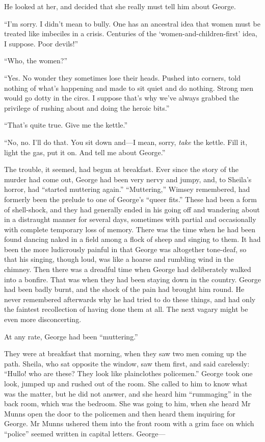 He looked at her, and decided that she really must tell him about George.

\enquote{I'm sorry. I didn't mean to bully. One has an ancestral idea that women must be treated like imbeciles in a crisis. Centuries of the \enquote{women-and-children-first} idea, I suppose. Poor devils!}

\enquote{Who, the women?}

\enquote{Yes. No wonder they sometimes lose their heads. Pushed into corners, told nothing of what's happening and made to sit quiet and do nothing. Strong men would go dotty in the circs. I suppose that's why we've always grabbed the privilege of rushing about and doing the heroic bits.}

\enquote{That's quite true. Give me the kettle.}

\enquote{No, no. I'll do that. You sit down and\allowbreak---\allowbreak I mean, sorry, \textit{take} the kettle. Fill it, light the gas, put it on. And tell me about George.}

The trouble, it seemed, had begun at breakfast. Ever since the story of the murder had come out, George had been very nervy and jumpy, and, to Sheila's horror, had \enquote{started muttering again.} \enquote{Muttering,} Wimsey remembered, had formerly been the prelude to one of George's \enquote{queer fits.} These had been a form of shell-shock, and they had generally ended in his going off and wandering about in a distraught manner for several days, sometimes with partial and occasionally with complete temporary loss of memory. There was the time when he had been found dancing naked in a field among a flock of sheep and singing to them. It had been the more ludicrously painful in that George was altogether tone-deaf, so that his singing, though loud, was like a hoarse and rumbling wind in the chimney. Then there was a dreadful time when George had deliberately walked into a bonfire. That was when they had been staying down in the country. George had been badly burnt, and the shock of the pain had brought him round. He never remembered afterwards why he had tried to do these things, and had only the faintest recollection of having done them at all. The next vagary might be even more disconcerting.

At any rate, George had been \enquote{muttering.}

They were at breakfast that morning, when they saw two men coming up the path. Sheila, who sat opposite the window, saw them first, and said carelessly: \enquote{Hullo! who are these? They look like plainclothes policemen.} George took one look, jumped up and rushed out of the room. She called to him to know what was the matter, but he did not answer, and she heard him \enquote{rummaging} in the back room, which was the bedroom. She was going to him, when she heard Mr Munns open the door to the policemen and then heard them inquiring for George. Mr Munns ushered them into the front room with a grim face on which \enquote{police} seemed written in capital letters. George---

